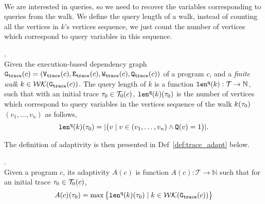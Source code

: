 {\\
We are interested in queries, so we need to recover the 
variables corresponding to queries from the walk. We define the query length of a walk, 
instead of counting all 
the vertices in $k$'s vertices sequence, we just count the number of vertices which correspond to query variables in this sequence.
%
\begin{defn}.
\label{def:qlen}
\\
Given 
the execution-based dependency graph $\mathtt{{G_{trace}}}({c}) = (\mathtt{{V_{trace}}}({c}), \mathtt{{E_{trace}}}({c}), \mathtt{{W_{trace}}}({c}), \mathtt{{Q_{trace}}}({c}))$ of a program $c$,
 and a \emph{finite walk} 
 $k \in \mathcal{WK}(\mathtt{{G_{trace}}}(c))$. 
The query length of $k$ is a function $\mathtt{len}^{\tt q}(k): \mathcal{T} \to \mathbb{N}$, such that with an initial trace  $\mathtt{\tau}_0 \in \mathcal{T}_0(c)$, $\mathtt{len}^{\tt q}(k)(\mathtt{\tau}_0)$ is
the number of vertices which correspond to query variables in the vertices sequence of the walk $k(\mathtt{\tau}_0)$
$(v_1, \ldots, v_{n})$ as follows, 
\[
  \mathtt{len}^{\tt q}(k)(\mathtt{\tau}_0) = |\big( v \mid v \in (v_1, \ldots, v_{n}) \land \mathtt{Q}(v) = 1 \big)|.
\]
\end{defn}
}
The definition of adaptivity is then presented in Def~\ref{def:trace_adapt} below.

\begin{defn}
  .
  \label{def:trace_adapt}
  \\
  Given a program ${c}$, 
  its adaptivity $A(c)$ is function 
  $A(c) : \mathcal{T} \to \mathbb{N}$ such that for an
  initial trace $\mathtt{\tau}_0 \in \mathcal{T}_0(c)$, 
 $$
  A(c)(\mathtt{\tau}_0) = \max \big 
  \{ \mathtt{len}^{\tt q}(k)(\mathtt{\tau}_0) \mid k \in \mathcal{WK}(\mathtt{{G_{trace}}}(c)) \big \} $$
  \end{defn}



